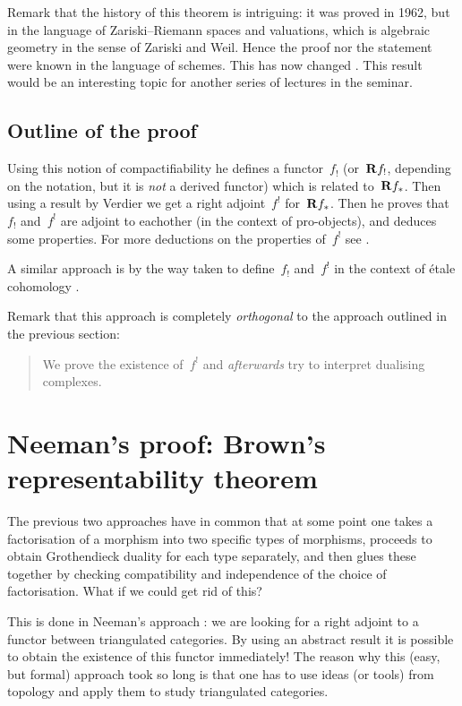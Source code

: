 \documentclass[10pt,a4paper]{article}
\begin{document}
Remark that the history of this theorem is intriguing: it was proved in 1962, but in the language of Zariski--Riemann spaces and valuations, which is algebraic geometry in the sense of Zariski and Weil. Hence the proof nor the statement were known in the language of schemes. This has now changed \cite{lutkebohmert-compactification,conrad-delignes-notes-nagata-compactification,deligne-plongement-de-nagata}. This result would be an interesting topic for another series of lectures in the seminar.

\subsection{Outline of the proof}
Using this notion of compactifiability he defines a functor~$f_!$ (or~$\mathbf{R} f_!$, depending on the notation, but it is \emph{not} a derived functor) which is related to~$\mathbf{R} f_*$. Then using a result by Verdier \cite{verdier-bourbaki-300} we get a right adjoint~$f^!$ for~$\mathbf{R} f_*$. Then he proves that~$f_!$ and~$f^!$ are adjoint to eachother (in the context of pro-objects), and deduces some properties. For more deductions on the properties of~$f^!$ see \cite{verdier-base-change-twisted-inverse-image}.

A similar approach is by the way taken to define~$f_!$ and~$f^!$ in the context of \'etale cohomology \cite[expos\'e XVII]{sga43}.

Remark that this approach is completely \emph{orthogonal} to the approach outlined in the previous section:
\begin{quote}
  We prove the existence of~$f^!$ and \emph{afterwards} try to interpret dualising complexes.
\end{quote}

\section{Neeman's proof: Brown's representability theorem}
\label{section:neeman}
The previous two approaches have in common that at some point one takes a factorisation of a morphism into two specific types of morphisms, proceeds to obtain Grothendieck duality for each type separately, and then glues these together by checking compatibility and independence of the choice of factorisation. What if we could get rid of this?

This is done in Neeman's approach \cite{neeman-grothendieck-duality-bousfield-brown}: we are looking for a right adjoint to a functor between triangulated categories. By using an abstract result it is possible to obtain the existence of this functor immediately! The reason why this (easy, but formal) approach took so long is that one has to use ideas (or tools) from topology and apply them to study triangulated categories.
\end{document}
